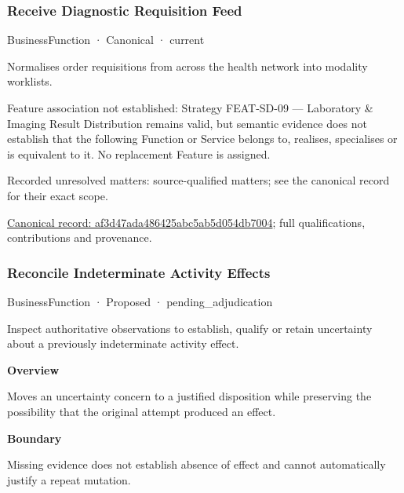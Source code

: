 \subsubsection{Receive Diagnostic Requisition Feed}

\label{element:af3d47ada486425abc5ab5d054db7004}
{\small BusinessFunction · Canonical · current}\par

Normalises order requisitions from across the health network into modality worklists.



Feature association not established: Strategy FEAT-SD-09 — Laboratory \& Imaging Result Distribution remains valid, but semantic evidence does not establish that the following Function or Service belongs to, realises, specialises or is equivalent to it. No replacement Feature is assigned.


{\small Recorded unresolved matters: source-qualified matters; see the canonical record for their exact scope.}\par
{\footnotesize \href{../../../../continuum/business/business-function/af3d47ada486425abc5ab5d054db7004.md}{Canonical record: af3d47ada486425abc5ab5d054db7004}; full qualifications, contributions and provenance.}\par
\subsubsection{Reconcile Indeterminate Activity Effects}

\label{element:eace49fe7b304ad786d460ccef622378}
{\small BusinessFunction · Proposed · pending\_adjudication}\par

Inspect authoritative observations to establish, qualify or retain uncertainty about a previously indeterminate activity effect.



\textbf{Overview}



Moves an uncertainty concern to a justified disposition while preserving the possibility that the original attempt produced an effect.



\textbf{Boundary}



Missing evidence does not establish absence of effect and cannot automatically justify a repeat mutation.


